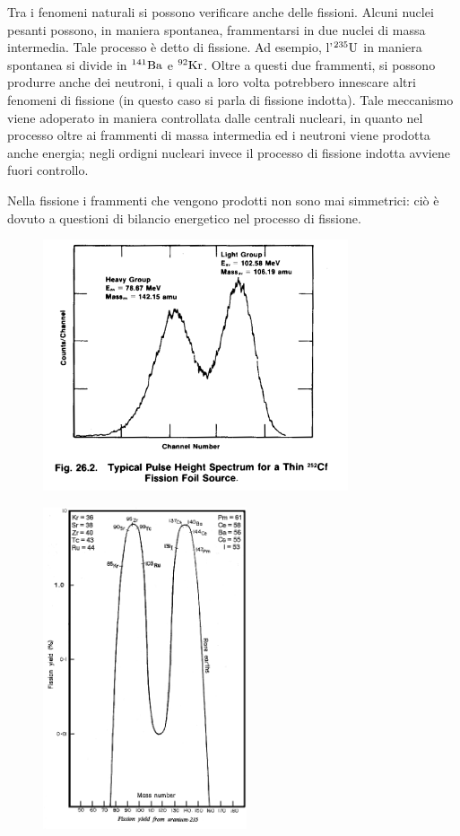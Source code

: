 Tra i fenomeni naturali si possono verificare anche delle fissioni. Alcuni nuclei pesanti possono, in maniera spontanea, frammentarsi in due nuclei di massa intermedia. Tale processo è detto di fissione. Ad esempio, l'$\rm ^{235}U$ in maniera spontanea si divide in $\rm ^{141}Ba$ e $\rm ^{92}Kr$. Oltre a questi due frammenti, si possono produrre anche dei neutroni, i quali a loro volta potrebbero innescare altri fenomeni di fissione (in questo caso si parla di fissione indotta). Tale meccanismo viene adoperato in maniera controllata dalle centrali nucleari, in quanto nel processo oltre ai frammenti di massa intermedia ed i neutroni viene prodotta anche energia; negli ordigni nucleari invece il processo di fissione indotta avviene fuori controllo.

Nella fissione i frammenti che vengono prodotti non sono mai simmetrici: ciò è dovuto a questioni di bilancio energetico nel processo di fissione.

\begin{minipage}{0.58\textwidth}
    \begin{figure}[H]
        \includegraphics[width=9cm]{immagini/Sorgenti_di_fissione_1.png}
    \end{figure}
\end{minipage}
\begin{minipage}{0.42\textwidth}
    \begin{figure}[H]
        \includegraphics[width=6cm]{immagini/Sorgenti_di_fissione_2.png}
    \end{figure}
\end{minipage}

